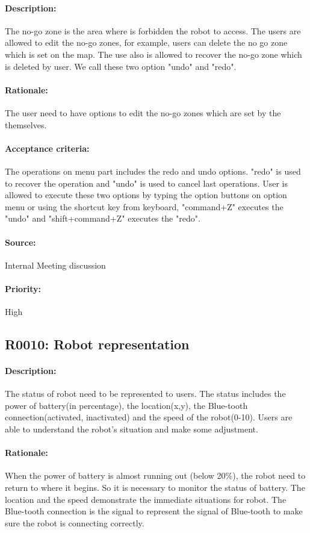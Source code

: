 \documentclass[11pt, a4paper]{report}
\begin{document}
\paragraph{Description:}
The no-go zone is the area where is forbidden the robot to access. The users are allowed to edit the no-go zones, for example, users can delete the no go zone which is set on the map. The use also is allowed to recover the no-go zone which is deleted by user. We call these two option "undo" and "redo".
\paragraph{Rationale:}
The user need to have options to edit the no-go zones which are set by the themselves.  
\paragraph{Acceptance criteria:}
The operations on menu part includes the redo and undo options. "redo" is used to recover the operation and "undo" is used to cancel last operations. User is allowed to execute these two options by typing the option buttons on option menu or using the shortcut key from keyboard, "command+Z" executes the "undo" and "shift+command+Z" executes the "redo".    
\paragraph{Source:}
Internal Meeting discussion
\paragraph{Priority:}
High

\subsection{R0010: Robot representation}
\paragraph{Description:}
The status of robot need to be represented to users. The status includes the power of battery(in percentage), the location(x,y), the Blue-tooth connection(activated, inactivated) and the speed of the robot(0-10). Users are able to understand the  robot's situation and make some adjustment.
\paragraph{Rationale:}
When the power of battery is almost running out (below 20\%), the robot need to return to where it begins. So it is necessary to monitor the status of battery. The location and the speed demonstrate the immediate situations for robot. The Blue-tooth connection is the signal to represent the signal of Blue-tooth to make sure the robot is connecting correctly.
\end{document}
